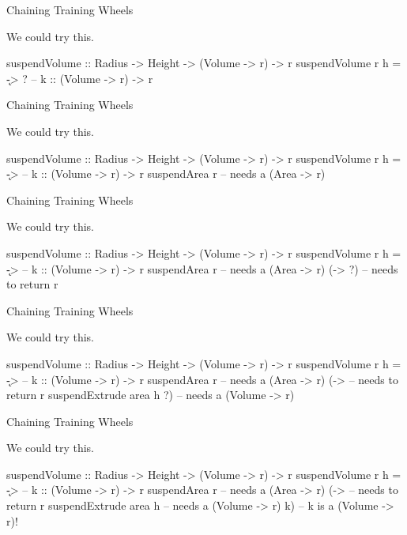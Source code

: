 \documentclass[ignorenonframetext,]{beamer}
\begin{document}
\begin{frame}[fragile]{Chaining Training Wheels}

We could try this.

\begin{haskellcode}
suspendVolume :: Radius -> Height -> (Volume -> r) -> r
suspendVolume r h = \k -> ?    -- k :: (Volume -> r) -> r
\end{haskellcode}

\end{frame}

\begin{frame}[fragile]{Chaining Training Wheels}

We could try this.

\begin{haskellcode}
suspendVolume :: Radius -> Height -> (Volume -> r) -> r
suspendVolume r h = \k ->      -- k :: (Volume -> r) -> r
  suspendArea r                -- needs a (Area -> r)
\end{haskellcode}

\end{frame}

\begin{frame}[fragile]{Chaining Training Wheels}

We could try this.

\begin{haskellcode}
suspendVolume :: Radius -> Height -> (Volume -> r) -> r
suspendVolume r h = \k ->      -- k :: (Volume -> r) -> r
  suspendArea r                -- needs a (Area -> r)
  (\area -> ?)                 -- needs to return r
\end{haskellcode}

\end{frame}

\begin{frame}[fragile]{Chaining Training Wheels}

We could try this.

\begin{haskellcode}
suspendVolume :: Radius -> Height -> (Volume -> r) -> r
suspendVolume r h = \k ->      -- k :: (Volume -> r) -> r
  suspendArea r                -- needs a (Area -> r)
  (\area ->                    -- needs to return r
    suspendExtrude area h ?)   -- needs a (Volume -> r)
\end{haskellcode}

\end{frame}

\begin{frame}[fragile]{Chaining Training Wheels}

We could try this.

\begin{haskellcode}
suspendVolume :: Radius -> Height -> (Volume -> r) -> r
suspendVolume r h = \k ->      -- k :: (Volume -> r) -> r
  suspendArea r                -- needs a (Area -> r)
  (\area ->                    -- needs to return r
    suspendExtrude area h      -- needs a (Volume -> r)
      k)                       -- k is a (Volume -> r)!
\end{haskellcode}

\end{frame}
\end{document}
